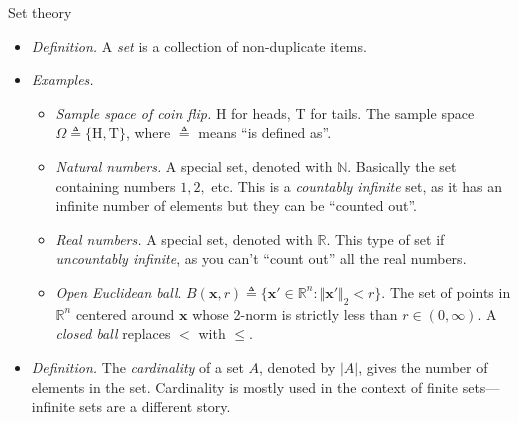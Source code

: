 \documentclass{beamer}
\begin{document}
\begin{frame}{Set theory}
    \begin{itemize}
        \item
        \textit{Definition.} A \textit{set} is a collection of non-duplicate
        items.

        \item
        \textit{Examples.}
        \begin{itemize}
            \item
            \textit{Sample space of coin flip.} H for heads, T for tails. The
            sample space $ \Omega \triangleq \{\text{H}, \text{T}\} $, where
            $ \triangleq $ means ``is defined as''.

            \item
            \textit{Natural numbers.} A special set, denoted with
            $ \mathbb{N} $. Basically the set containing numbers
            $ 1, 2, $ etc. This is a \textit{countably infinite} set, as it
            has an infinite number of elements but they can be ``counted out''.

            \item
            \textit{Real numbers.} A special set, denoted with $ \mathbb{R} $.
            This type of set if \textit{uncountably infinite}, as you can't
            ``count out'' all the real numbers.

            \item
            \textit{Open Euclidean ball}. $ B(\mathbf{x}, r) \triangleq
            \{\mathbf{x}' \in \mathbb{R}^n : \Vert\mathbf{x}'\Vert_2 < r\} $.
            The set of points in $ \mathbb{R}^n $ centered around
            $ \mathbf{x} $ whose 2-norm is strictly less than
            $ r \in (0, \infty) $. A \textit{closed ball} replaces $ < $ with
            $ \le $.
        \end{itemize}

        \item
        \textit{Definition.} The \textit{cardinality} of a set $ A $, denoted
        by $ |A| $, gives the number of elements in the set. Cardinality is
        mostly used in the context of finite sets---infinite sets are a
        different story.
    \end{itemize}
\end{frame}
\end{document}
